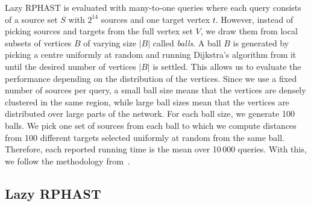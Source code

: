 \documentclass[manuscript]{acmart}
\begin{document}
Lazy RPHAST is evaluated with many-to-one queries where each query consists of a source set $S$ with $2^{14}$ sources and one target vertex $t$.
However, instead of picking sources and targets from the full vertex set $V$, we draw them from local subsets of vertices $B$ of varying size $|B|$ called \emph{balls}.
A ball $B$ is generated by picking a centre uniformly at random and running Dijkstra's algorithm from it until the desired number of vertices $|B|$ is settled.
This allows us to evaluate the performance depending on the distribution of the vertices.
Since we use a fixed number of sources per query, a small ball size means that the vertices are densely clustered in the same region, while large ball sizes mean that the vertices are distributed over large parts of the network.
For each ball size, we generate 100 balls.
We pick one set of sources from each ball to which we compute distances from 100 different targets selected uniformly at random from the same ball.
Therefore, each reported running time is the mean over 10\,000 queries.
With this, we follow the methodology from~\cite{delling_et_al:OASIcs:2011:3266}.

\subsection{Lazy RPHAST}\label{sec:exp_lazy_rphast}
\end{document}
